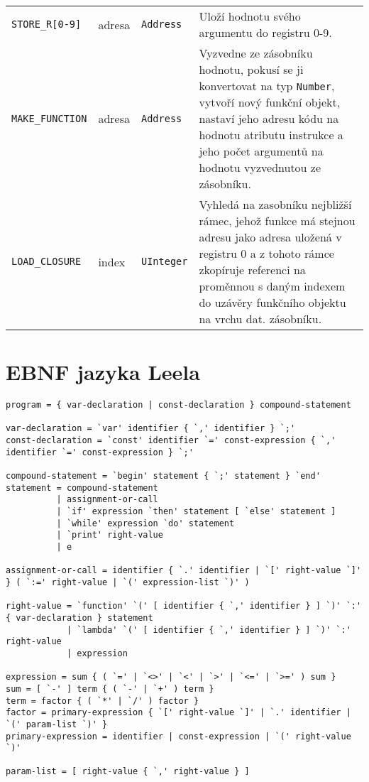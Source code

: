 \documentclass[10pt,a4paper]{article}
\begin{document}
\begin{longtable}{ l l l p{} }
\verb"STORE_R[0-9]" & adresa & \texttt{Address} & Uloží hodnotu svého argumentu do registru 0-9. \\
\verb"MAKE_FUNCTION" & adresa & \texttt{Address} & Vyzvedne ze zásobníku hodnotu, pokusí se ji konvertovat na typ \texttt{Number}, vytvoří nový funkční objekt, nastaví jeho adresu kódu na hodnotu atributu instrukce a jeho počet argumentů na hodnotu vyzvednutou ze zásobníku. \\
\verb"LOAD_CLOSURE" & index & \texttt{UInteger} & Vyhledá na zasobníku nejbližší rámec, jehož funkce má stejnou adresu jako adresa uložená v registru 0 a z tohoto rámce zkopíruje referenci na proměnnou s daným indexem do uzávěry funkčního objektu na vrchu dat. zásobníku. \\
\hline
\end{longtable}

\section{EBNF jazyka Leela}
\label{sec:ebnf}

\begin{lstlisting}[identifierstyle=\textbf]
program = { var-declaration | const-declaration } compound-statement

var-declaration = `var' identifier { `,' identifier } `;'
const-declaration = `const' identifier `=' const-expression { `,' identifier `=' const-expression } `;'

compound-statement = `begin' statement { `;' statement } `end'
statement = compound-statement
          | assignment-or-call
          | `if' expression `then' statement [ `else' statement ]
          | `while' expression `do' statement
          | `print' right-value
          | e

assignment-or-call = identifier { `.' identifier | `[' right-value `]' } ( `:=' right-value | `(' expression-list `)' )

right-value = `function' `(' [ identifier { `,' identifier } ] `)' `:' { var-declaration } statement
            | `lambda' `(' [ identifier { `,' identifier } ] `)' `:' right-value
            | expression

expression = sum { ( `=' | `<>' | `<' | `>' | `<=' | `>=' ) sum }
sum = [ `-' ] term { ( `-' | `+' ) term }
term = factor { ( `*' | `/' ) factor }
factor = primary-expression { `[' right-value `]' | `.' identifier | `(' param-list `)' }
primary-expression = identifier | const-expression | `(' right-value `)'

param-list = [ right-value { `,' right-value } ]

\end{lstlisting}
\end{document}
